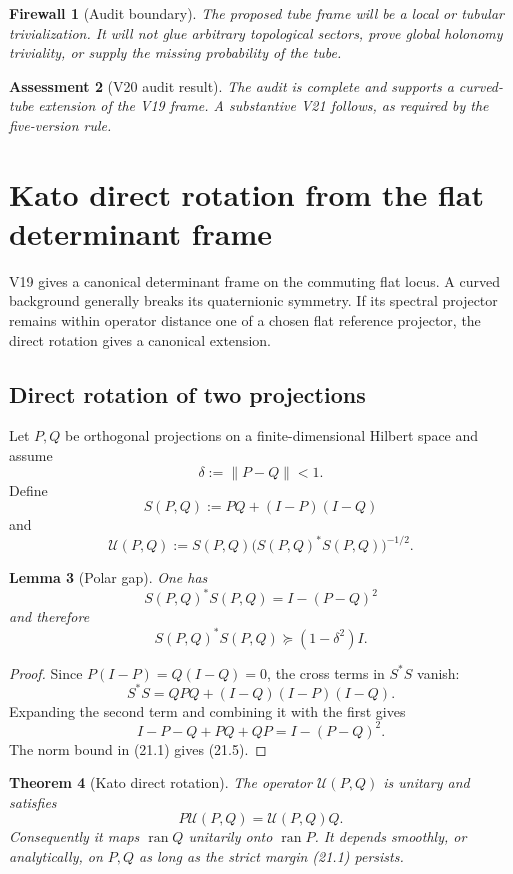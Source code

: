 \documentclass[11pt]{article}
\newtheorem{theorem}{Theorem}[section]
\newtheorem{lemma}[theorem]{Lemma}
\newtheorem{assessment}[theorem]{Assessment}
\newtheorem{firewall}[theorem]{Firewall}
\begin{document}
\begin{firewall}[Audit boundary]
\label{fw:v11v20-boundary}
The proposed tube frame will be a local or tubular trivialization.  It
will not glue arbitrary topological sectors, prove global holonomy
triviality, or supply the missing probability of the tube.
\end{firewall}

\begin{assessment}[V20 audit result]
\label{ass:v11v20}
The audit is complete and supports a curved-tube extension of the V19
frame.  A substantive V21 follows, as required by the five-version rule.
\end{assessment}


\section{Kato direct rotation from the flat determinant frame}
\label{sec:v11v21}

V19 gives a canonical determinant frame on the commuting flat locus.
A curved background generally breaks its quaternionic symmetry.  If its
spectral projector remains within operator distance one of a chosen flat
reference projector, the direct rotation gives a canonical extension.

\subsection{Direct rotation of two projections}

Let \(P,Q\) be orthogonal projections on a finite-dimensional Hilbert
space and assume
\[
 \delta:=\|P-Q\|<1.
 \tag{21.1}
\]
Define
\[
 S(P,Q):=PQ+(I-P)(I-Q)
 \tag{21.2}
\]
and
\[
 \mathcal U(P,Q)
 :=
 S(P,Q)\bigl(S(P,Q)^*S(P,Q)\bigr)^{-1/2}.
 \tag{21.3}
\]

\begin{lemma}[Polar gap]
\label{lem:v11v21-polar-gap}
One has
\[
 S(P,Q)^*S(P,Q)=I-(P-Q)^2
 \tag{21.4}
\]
and therefore
\[
 S(P,Q)^*S(P,Q)\succeq(1-\delta^2)I.
 \tag{21.5}
\]
\end{lemma}

\begin{proof}
Since \(P(I-P)=Q(I-Q)=0\), the cross terms in \(S^*S\) vanish:
\[
 S^*S=QPQ+(I-Q)(I-P)(I-Q).
\]
Expanding the second term and combining it with the first gives
\[
 I-P-Q+PQ+QP=I-(P-Q)^2.
\]
The norm bound in (21.1) gives (21.5).
\end{proof}

\begin{theorem}[Kato direct rotation]
\label{thm:v11v21-direct-rotation}
The operator \(\mathcal U(P,Q)\) is unitary and satisfies
\[
 P\mathcal U(P,Q)=\mathcal U(P,Q)Q.
 \tag{21.6}
\]
Consequently it maps \(\operatorname{ran}Q\) unitarily onto
\(\operatorname{ran}P\).  It depends smoothly, or analytically, on
\(P,Q\) as long as the strict margin (21.1) persists.
\end{theorem}
\end{document}

